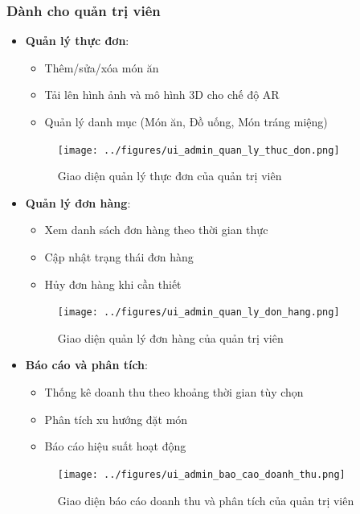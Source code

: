 \documentclass[12pt,a4paper]{article}
\begin{document}
\subsubsection{Dành cho quản trị viên}
\begin{itemize}[leftmargin=1cm]
    \item \textbf{Quản lý thực đơn}:
        \begin{itemize}[leftmargin=0.5cm]
            \item Thêm/sửa/xóa món ăn
            \item Tải lên hình ảnh và mô hình 3D cho chế độ AR
            \item Quản lý danh mục (Món ăn, Đồ uống, Món tráng miệng)
        \end{itemize}
\begin{figure}[H]
    \centering
    \texttt{[image: ../figures/ui\_admin\_quan\_ly\_thuc\_don.png]} %
    \caption{Giao diện quản lý thực đơn của quản trị viên}
    \label{fig:ui_admin_menu}
\end{figure}

    \item \textbf{Quản lý đơn hàng}:
        \begin{itemize}[leftmargin=0.5cm]
            \item Xem danh sách đơn hàng theo thời gian thực
            \item Cập nhật trạng thái đơn hàng
            \item Hủy đơn hàng khi cần thiết
        \end{itemize}
\begin{figure}[H]
    \centering
    \texttt{[image: ../figures/ui\_admin\_quan\_ly\_don\_hang.png]} %
    \caption{Giao diện quản lý đơn hàng của quản trị viên}
    \label{fig:ui_admin_orders}
\end{figure}

    \item \textbf{Báo cáo và phân tích}:
        \begin{itemize}[leftmargin=0.5cm]
            \item Thống kê doanh thu theo khoảng thời gian tùy chọn
            \item Phân tích xu hướng đặt món
            \item Báo cáo hiệu suất hoạt động
        \end{itemize}
\begin{figure}[H]
    \centering
    \texttt{[image: ../figures/ui\_admin\_bao\_cao\_doanh\_thu.png]} %
    \caption{Giao diện báo cáo doanh thu và phân tích của quản trị viên}
    \label{fig:ui_admin_revenue}
\end{figure}


\end{itemize}
\end{document}
